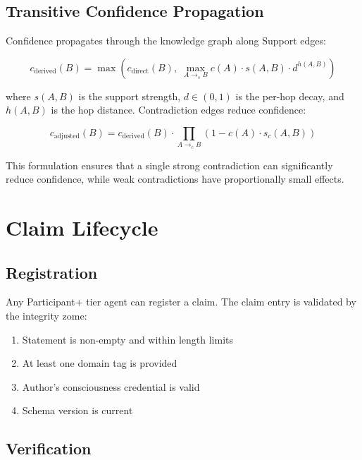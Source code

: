 \documentclass[11pt,twocolumn]{article}
\begin{document}
\subsection{Transitive Confidence Propagation}

Confidence propagates through the knowledge graph along Support edges:

\begin{equation}
  c_{\text{derived}}(B) = \max\left(c_{\text{direct}}(B), \;
    \max_{A \to_s B} c(A) \cdot s(A, B) \cdot d^{h(A,B)}\right)
\end{equation}

where $s(A, B)$ is the support strength, $d \in (0, 1)$ is the per-hop
decay, and $h(A, B)$ is the hop distance. Contradiction edges reduce
confidence:

\begin{equation}
  c_{\text{adjusted}}(B) = c_{\text{derived}}(B) \cdot
    \prod_{A \to_c B} (1 - c(A) \cdot s_c(A, B))
\end{equation}

This formulation ensures that a single strong contradiction can significantly
reduce confidence, while weak contradictions have proportionally small effects.

\section{Claim Lifecycle}

\subsection{Registration}

Any Participant+ tier agent can register a claim. The claim entry is
validated by the integrity zome:

\begin{enumerate}[nosep]
  \item Statement is non-empty and within length limits
  \item At least one domain tag is provided
  \item Author's consciousness credential is valid
  \item Schema version is current
\end{enumerate}

\subsection{Verification}
\end{document}
